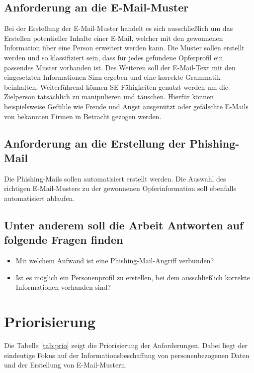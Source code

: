 	\subsection{Anforderung an die E-Mail-Muster}
	Bei der Erstellung der E-Mail-Muster handelt es sich ausschließlich um das Erstellen potentieller Inhalte einer E-Mail, welcher mit den gewonnenen Information über eine Person erweitert werden kann. Die Muster sollen erstellt werden und so klassifiziert sein, dass für jedes gefundene Opferprofil ein passendes Muster vorhanden ist. Des Weiteren soll der E-Mail-Text mit den eingesetzten Informationen Sinn ergeben und eine korrekte Grammatik beinhalten. Weiterführend können SE-Fähigkeiten genutzt werden um die Zielperson tatsächlich zu manipulieren und täuschen. Hierfür können beispielsweise Gefühle wie Freude und Angst ausgenützt oder gefälschte E-Mails von bekannten Firmen in Betracht gezogen werden.
	
	\subsection{Anforderung an die Erstellung der Phishing-Mail}
	Die Phishing-Mails sollen automatisiert erstellt werden. Die Auswahl des richtigen E-Mail-Musters zu der gewonnenen Opferinformation soll ebenfalls automatisiert ablaufen.
	
	\subsection{Unter anderem soll die Arbeit Antworten auf folgende Fragen finden}
	\begin{itemize}
		\item Mit welchem Aufwand ist eine Phishing-Mail-Angriff verbunden?
		\item Ist es möglich ein Personenprofil zu erstellen, bei dem ausschließlich korrekte Informationen vorhanden sind?
	\end{itemize}
\FloatBarrier

\section{Priorisierung} %
\label{sec:} %
Die Tabelle \ref{tab:prio} zeigt die Priorisierung der Anforderungen. Dabei liegt der eindeutige Fokus auf der Informationsbeschaffung von personenbezogenen Daten und der Erstellung von E-Mail-Mustern.

